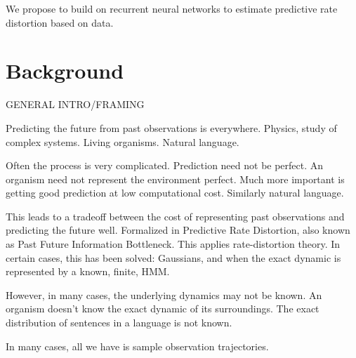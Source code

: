 \documentclass[11pt,letterpaper]{article}
\begin{document}
We propose to build on recurrent neural networks to estimate predictive rate distortion based on data.



\section{Background}

GENERAL INTRO/FRAMING



Predicting the future from past observations is everywhere.
Physics, study of complex systems.
Living organisms.
Natural language.

Often the process is very complicated.
Prediction need not be perfect.
An organism need not represent the environment perfect. Much more important is getting good prediction at low computational cost.
Similarly natural language.

This leads to a tradeoff between the cost of representing past observations and predicting the future well.
Formalized in Predictive Rate Distortion, also known as Past Future Information Bottleneck.
This applies rate-distortion theory.
In certain cases, this has been solved: Gaussians, and when the exact dynamic is represented by a known, finite, HMM.

However, in many cases, the underlying dynamics may not be known.
An organism doesn't know the exact dynamic of its surroundings.
The exact distribution of sentences in a language is not known.

In many cases, all we have is sample observation trajectories.




\end{document}

